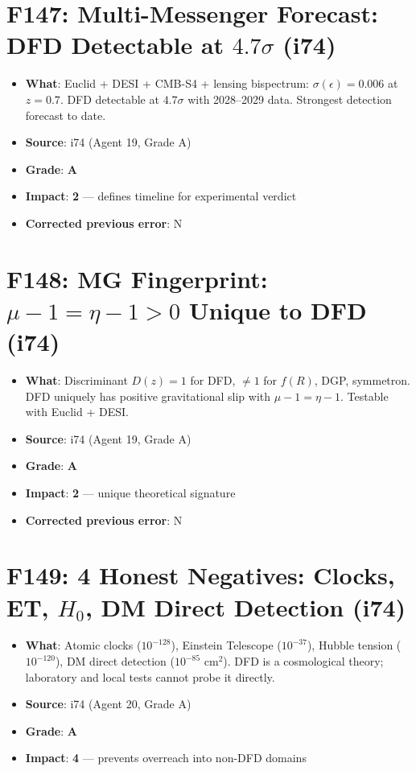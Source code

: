 \documentclass[11pt,a4paper]{article}
\newcommand{\grade}[1]{\textbf{#1}}
\newcommand{\impact}[1]{\textbf{#1}}
\begin{document}
\section{F147: Multi-Messenger Forecast: DFD Detectable at $4.7\sigma$ (i74)}
\begin{itemize}[nosep]
\item \textbf{What}: Euclid + DESI + CMB-S4 + lensing bispectrum: $\sigma(\epsilon) = 0.006$ at $z = 0.7$. DFD detectable at $4.7\sigma$ with 2028--2029 data. Strongest detection forecast to date.
\item \textbf{Source}: i74 (Agent 19, Grade A)
\item \textbf{Grade}: \grade{A}
\item \textbf{Impact}: \impact{2} --- defines timeline for experimental verdict
\item \textbf{Corrected previous error}: N
\end{itemize}

\section{F148: MG Fingerprint: $\mu - 1 = \eta - 1 > 0$ Unique to DFD (i74)}
\begin{itemize}[nosep]
\item \textbf{What}: Discriminant $D(z) = 1$ for DFD, $\neq 1$ for $f(R)$, DGP, symmetron. DFD uniquely has positive gravitational slip with $\mu - 1 = \eta - 1$. Testable with Euclid + DESI.
\item \textbf{Source}: i74 (Agent 19, Grade A)
\item \textbf{Grade}: \grade{A}
\item \textbf{Impact}: \impact{2} --- unique theoretical signature
\item \textbf{Corrected previous error}: N
\end{itemize}

\section{F149: 4 Honest Negatives: Clocks, ET, $H_0$, DM Direct Detection (i74)}
\begin{itemize}[nosep]
\item \textbf{What}: Atomic clocks ($10^{-128}$), Einstein Telescope ($10^{-37}$), Hubble tension ($10^{-120}$), DM direct detection ($10^{-85}$ cm$^2$). DFD is a cosmological theory; laboratory and local tests cannot probe it directly.
\item \textbf{Source}: i74 (Agent 20, Grade A)
\item \textbf{Grade}: \grade{A}
\item \textbf{Impact}: \impact{4} --- prevents overreach into non-DFD domains
\end{itemize}
\end{document}

